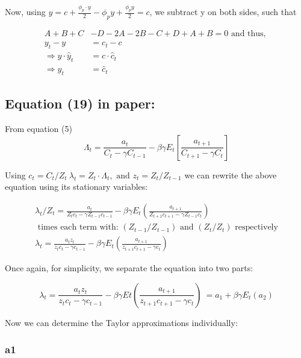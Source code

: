 \documentclass[11pt,preprint, authoryear]{elsarticle}
\numberwithin{equation}{section}
\numberwithin{figure}{section}
\numberwithin{table}{section}
\begin{document}
Now, using
\(y = c + \frac{\phi_{p} \cdot y}{2} - \phi_{p} y + \frac{\phi_{p} y} {2} = c\),
we subtract y on both sides, such that

\[\begin{aligned}
A + B + C &- D - 2A - 2B - C + D + A + B = 0
\text{ and thus, }
\\
y_{t} - y &= c_t - c
\\
\Rightarrow y \cdot \hat{y}_t &= c \cdot \hat{c}_t
\\
\Rightarrow \hat{y}_t &= \hat{c}_t
\end{aligned}\]

\hypertarget{equation-19-in-paper}{%
\subsection{Equation (19) in paper:}\label{equation-19-in-paper}}

From equation (5)
\[\Lambda_t = \frac{a_t}{C_t-\gamma C_{t-1}} - \beta \gamma E_t \left[ \frac{a_{t+1}}{C_{t+1} - \gamma C_t} \right]\]

Using
\(c_{t}=C_{t} / Z_{t} \  \lambda_{t}=Z_{t} \cdot \Lambda_{t}, \text{ and } z_t = Z_t / Z_{t-1}\)
we can rewrite the above equation using its stationary variables:

\[\begin{aligned}
\lambda_{t} / Z_t =\frac{a_{t}}{Z_{t} c_{t}-\gamma Z_{t-1} c_{t-1}}-\beta \gamma E_{t} \left(\frac{a_{t+1}}{Z_{t+1} c_{t+1}-\gamma Z_{t-1} c_{t}} \right)\\
\text{ times each term with: } \left(Z_{t-1} / Z_{t-1}\right) \text{ and } (Z_{t} / Z_{t}) \text{ respectively} \\
\lambda_{t} =\frac{a_{t} z_{t}}{z_{t} c_{t}-\gamma c_{t-1}}-\beta \gamma E_{t}\left(\frac{a_{t+1}}{z_{t+1} c_{t+1}-\gamma c_{t}}\right)
\end{aligned}\]

Once again, for simplicity, we separate the equation into two parts:

\[\lambda_{t}=\frac{a_{t} z_{t}}{z_{t} c_{t}-\gamma c_{t-1}}-\beta \gamma E{t}\left(\frac{a_{t+1}}{z_{t+1} c_{t+1}-\gamma c_{t}}\right)\
= a_1 + \beta \gamma E_t (a_2)\]

Now we can determine the Taylor approximations individually:

\hypertarget{a1}{%
\subsubsection{a1}\label{a1}}
\end{document}
